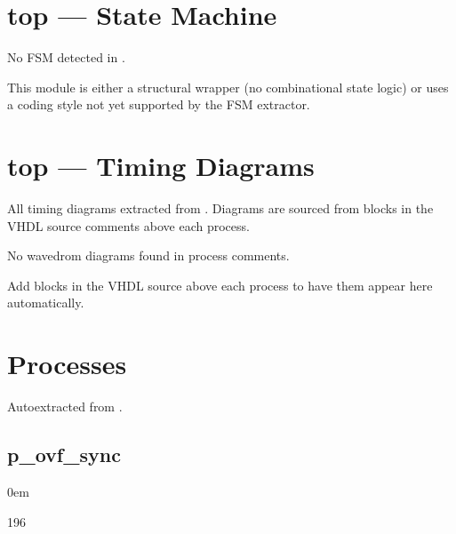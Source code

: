 \documentclass[letterpaper,10pt,english]{sphinxmanual}
\begin{document}
\section{top — State Machine}
\label{\detokenize{modules/top/fsm:top-state-machine}}\label{\detokenize{modules/top/fsm::doc}}
\sphinxAtStartPar
No FSM detected in .

\sphinxAtStartPar
This module is either a structural wrapper (no combinational
state logic) or uses a coding style not yet supported by the
FSM extractor.

\sphinxstepscope


\section{top — Timing Diagrams}
\label{\detokenize{modules/top/timing:top-timing-diagrams}}\label{\detokenize{modules/top/timing::doc}}
\sphinxAtStartPar
All timing diagrams extracted from .
Diagrams are sourced from  blocks in the VHDL
source comments above each process.

\sphinxAtStartPar
No wavedrom diagrams found in process comments.

\sphinxAtStartPar
Add  blocks in the VHDL source above each
process to have them appear here automatically.

\sphinxstepscope


\section{Processes}
\label{\detokenize{modules/top/processes/index:processes}}\label{\detokenize{modules/top/processes/index::doc}}
\sphinxAtStartPar
Auto\sphinxhyphen{}extracted from .

\sphinxstepscope


\subsection{p\_ovf\_sync}
\label{\detokenize{modules/top/processes/p_ovf_sync:p-ovf-sync}}\label{\detokenize{modules/top/processes/p_ovf_sync::doc}}
\begin{DUlineblock}{0em}
\item[]  
\item[]  196
\item[]  
\item[]  
\end{DUlineblock}
\end{document}

